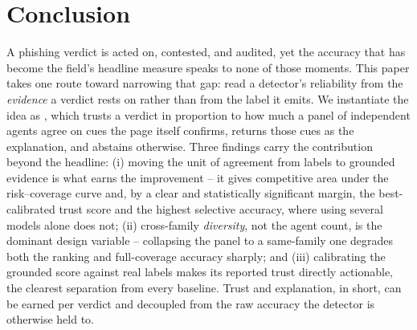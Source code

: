 \section{Conclusion}
\label{sec:conclusion}

A phishing verdict is acted on, contested, and audited, yet the accuracy that has
become the field's headline measure speaks to none of those moments. This paper
takes one route toward narrowing that gap: read a detector's reliability from the
\emph{evidence} a verdict rests on rather than from the label it emits. We
instantiate the idea as \toolname{}, which trusts a verdict in proportion to how
much a panel of independent agents agree on cues the page itself confirms, returns
those cues as the explanation, and abstains otherwise. Three findings carry the
contribution beyond the headline: (i) moving the unit of agreement from labels to
grounded evidence is what earns the improvement -- it gives competitive area under the
risk--coverage curve and, by a clear and statistically significant margin, the
best-calibrated trust score and the highest selective accuracy, where
using several models alone does not; (ii) cross-family \emph{diversity}, not the agent
count, is the dominant design variable -- collapsing the panel to a same-family one
degrades both the ranking and full-coverage accuracy sharply; and (iii) calibrating the
grounded score against real labels makes its reported trust directly actionable, the
clearest separation from every baseline. Trust and explanation, in short, can be earned
per verdict and decoupled from the raw accuracy the detector is otherwise held to.

